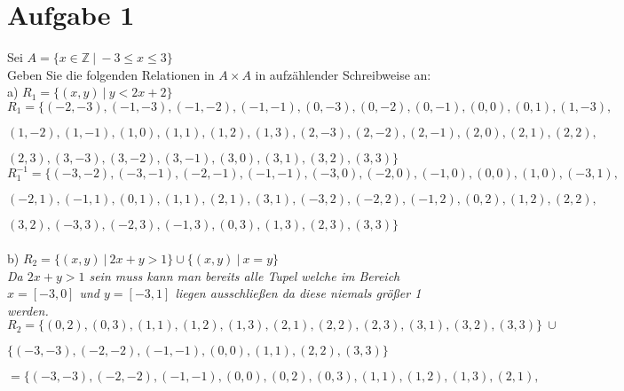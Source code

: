 \section*{Aufgabe 1}

Sei $A = \{x \in \mathbb{Z} \ | \ -3 \leq x \leq 3\}$\\

Geben Sie die folgenden Relationen in $A \times A$ in aufzählender Schreibweise an:\\

a) $R_1 = \{(x,y) \ | \ y < 2x + 2\}$\\

$R_1 = \{(-2,-3), (-1,-3), (-1,-2), (-1,-1), (0,-3), (0,-2), (0,-1), (0,0), (0,1), (1,-3),$

\hspace{1.3cm}$(1,-2), (1,-1), (1,0), (1,1), (1,2), (1,3), (2,-3), (2,-2), (2,-1), (2,0), (2,1), (2,2),$

\hspace{1.3cm}$(2,3), (3,-3), (3,-2), (3,-1), (3,0), (3,1), (3,2), (3,3)\}$\\

$R_{1}^{-1} = \{(-3,-2), (-3,-1), (-2,-1), (-1,-1), (-3,0), (-2,0), (-1,0), (0,0), (1,0), (-3,1),$

\hspace{1.5cm}$(-2,1), (-1,1), (0,1), (1,1), (2,1), (3,1), (-3,2), (-2,2), (-1,2), (0,2), (1,2), (2,2),$

\hspace{1.5cm}$(3,2), (-3,3), (-2,3), (-1,3), (0,3), (1,3), (2,3), (3,3)\}$\\~\\

b) $R_2 = \{(x,y) \ | \ 2x + y > 1\} \cup \{(x,y) \ | \ x = y\}$\\

\textit{Da $2x + y > 1$ sein muss kann man bereits alle Tupel welche im Bereich $x = [-3, 0]$ und $y = [-3, 1]$ liegen ausschließen da diese niemals größer 1 werden.}\\

$R_2 = \{(0,2), (0,3), (1,1), (1,2), (1,3), (2,1), (2,2), (2,3), (3,1), (3,2), (3,3)\} \ \cup$

\hspace{1.05cm}$\{(-3,-3), (-2,-2), (-1,-1), (0,0), (1,1), (2,2), (3,3)\}$

\hspace{0.63cm}$ = \{(-3,-3), (-2,-2), (-1,-1), (0,0), (0,2), (0,3), (1,1), (1,2), (1,3), (2,1),$

